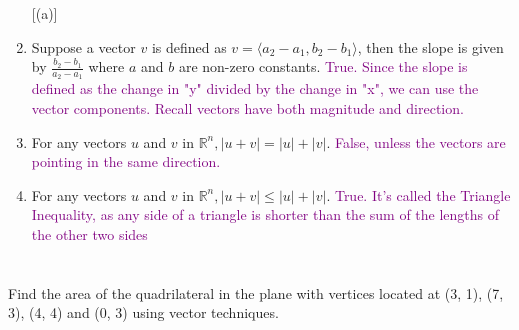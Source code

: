 \documentclass{article}
\begin{document}
\begin{enumerate} [(a)]
 \item {}  Suppose a vector $v$ is defined as $v = \langle a_2-a_1, b_2 - b_1 \rangle$, then the slope is given by $\frac{b_2 - b_1}{a_2-a_1}$ where $a$ and $b$ are non-zero constants. \newline
\textcolor{purple}{True. Since the slope is defined as the change in "y" divided by the change in "x", we can use the vector components. Recall vectors have both magnitude and direction.}
    \item  {}  For any vectors $u$ and $v$ in $\mathbb{R}^{n},|u+v|=|u|+|v|$. \newline
\textcolor{purple}{False, unless the vectors are pointing in the same direction.}
    \item {}  For any vectors $u$ and $v$ in $\mathbb{R}^{n},|u+v| \leq|u|+|v|$. \newline 
\textcolor{purple}{True. It’s called the Triangle Inequality, as any side of a triangle is shorter than the sum of the lengths
of the other two sides}
\end{enumerate}


\section{}
Find the area of the quadrilateral in the plane with vertices located at (3, 1), (7, 3), (4, 4) and (0, 3) using vector techniques.
\end{document}
